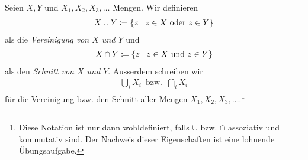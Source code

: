 
\begin{definn}

  Seien $X,Y$ und $X_{1}, X_{2}, X_{3}, \dots$ Mengen. Wir definieren
  \begin{align*}
    X \cup Y \coloneqq \{ z \mid z\in X \text{ oder } z\in Y\}
  \end{align*}
  als die \emph{Vereinigung von $X$ und $Y$} und
  \begin{align*}
    X \cap Y \coloneqq \{ z \mid z\in X \text{ und } z\in Y\}
  \end{align*}
  als den \emph{Schnitt von $X$ und $Y$}.
  Ausserdem schreiben wir
  \begin{align*}
    \bigcup_{i}X_{i} \,\text{ bzw. }\, \bigcap_{i}X_{i}
  \end{align*}
  für die Vereinigung bzw. den Schnitt aller Mengen $X_{1}, X_{2}, X_{3}, \dots$.\footnote{Diese
    Notation ist nur dann wohldefiniert, falls $\cup$ bzw. $\cap$ assoziativ
  und kommutativ sind. Der Nachweis dieser Eigenschaften ist eine lohnende
  Übungsaufgabe.}
\end{definn}

















